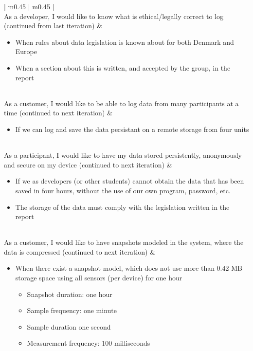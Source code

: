 \begin{center}
\begin{longtable}{| m{} | m{} |}
	 \\ \hline
	As a developer, I would like to know what is ethical/legally correct to log (continued from last iteration) & 
	\begin{itemize}[noitemsep,topsep=0pt,parsep=0pt,partopsep=0pt]
		\item When rules about data legislation is known about for both Denmark and Europe
		\item When a section about this is written, and accepted by the group, in the report
	\end{itemize} \\ \hline
	As a customer, I would like to be able to log data from many participants at a time (continued to next iteration) & 
	\begin{itemize}[noitemsep,topsep=0pt,parsep=0pt,partopsep=0pt]
	 	\item If we can log and save the data persistant on a remote storage from four units
	 \end{itemize} \\ \hline
	As a participant, I would like to have my data stored persistently, anonymously and secure on my device (continued to next iteration) & 
	\begin{itemize}[noitemsep,topsep=0pt,parsep=0pt,partopsep=0pt]
	 	\item If we as developers (or other students) cannot obtain the data that has been saved in four hours, without the use of our own program, password, etc.
	 	\item The storage of the data must comply with the legislation written in the report
	 \end{itemize} \\ \hline
	As a customer, I would like to have snapshots modeled in the system, where the data is compressed (continued to next iteration) & 
	\begin{itemize}[noitemsep,topsep=0pt,parsep=0pt,partopsep=0pt]
		\item When there exist a snapshot model, which does not use more than 0.42 MB storage space using all sensors (per device) for one hour
			\begin{itemize}[noitemsep,topsep=0pt,parsep=0pt,partopsep=0pt]
				\item Snapshot duration: one hour
				\item Sample frequency: one minute
				\item Sample duration one second
				\item Measurement frequency: 100 milliseconds
			\end{itemize}
	 \end{itemize} \\ \hline


\end{longtable}
\end{center}
